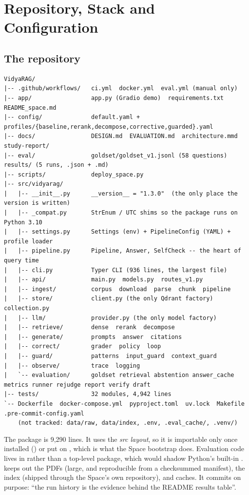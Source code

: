 \chapter{Repository, Stack and Configuration}
\label{ch:stack}

\section{The repository}

\begin{lstlisting}[language={},numbers=none,basicstyle=\ttfamily\scriptsize,frame=single]
VidyaRAG/
|-- .github/workflows/   ci.yml  docker.yml  eval.yml (manual only)
|-- app/                 app.py (Gradio demo)  requirements.txt  README_space.md
|-- config/              default.yaml + profiles/{baseline,rerank,decompose,corrective,guarded}.yaml
|-- docs/                DESIGN.md  EVALUATION.md  architecture.mmd  study-report/
|-- eval/                goldset/goldset_v1.jsonl (58 questions)  results/ (5 runs, .json + .md)
|-- scripts/             deploy_space.py
|-- src/vidyarag/
|   |-- __init__.py      __version__ = "1.3.0"  (the only place the version is written)
|   |-- _compat.py       StrEnum / UTC shims so the package runs on Python 3.10
|   |-- settings.py      Settings (env) + PipelineConfig (YAML) + profile loader
|   |-- pipeline.py      Pipeline, Answer, SelfCheck -- the heart of query time
|   |-- cli.py           Typer CLI (936 lines, the largest file)
|   |-- api/             main.py  models.py  routes_v1.py
|   |-- ingest/          corpus  download  parse  chunk  pipeline
|   |-- store/           client.py (the only Qdrant factory)  collection.py
|   |-- llm/             provider.py (the only model factory)
|   |-- retrieve/        dense  rerank  decompose
|   |-- generate/        prompts  answer  citations
|   |-- correct/         grader  policy  loop
|   |-- guard/           patterns  input_guard  context_guard
|   |-- observe/         trace  logging
|   `-- evaluation/      goldset retrieval abstention answer_cache metrics runner rejudge report verify draft
|-- tests/               32 modules, 4,942 lines
`-- Dockerfile  docker-compose.yml  pyproject.toml  uv.lock  Makefile  .pre-commit-config.yaml
    (not tracked: data/raw, data/index, .env, .eval_cache/, .venv/)
\end{lstlisting}

The package is 9,290 lines. It uses the \emph{src layout}, so it is importable only once installed () or put on , which is what the Space bootstrap does. Evaluation code lives in  rather than a top-level  package, which would shadow Python's built-in .  keeps out the PDFs (large, and reproducible from a checksummed manifest), the index (shipped through the Space's own repository),  and caches. It commits  on purpose: ``the run history is the evidence behind the README results table''.

